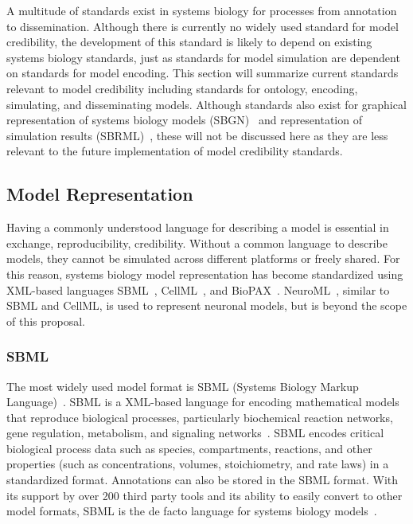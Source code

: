 \documentclass[12pt]{report}
\begin{document}
A multitude of standards exist in systems biology for processes from annotation to dissemination. Although there is currently no widely used standard for model credibility, the development of this standard is likely to depend on existing systems biology standards, just as standards for model simulation are dependent on standards for model encoding. This section will summarize current standards relevant to model credibility including standards for ontology, encoding, simulating, and disseminating models.  Although standards also exist for graphical representation of systems biology models (SBGN)~\cite{SBGN} and representation of simulation results (SBRML)~\cite{SBRML}, these will not be discussed here as they are less relevant to the future implementation of model credibility standards. 

\subsection{Model Representation}
Having a commonly understood language for describing a model is essential in exchange, reproducibility, credibility. Without a common language to describe models, they cannot be simulated across different platforms or freely shared. For this reason, systems biology model representation has become standardized using XML-based languages SBML~\cite{Klipp2007StandardsIC, machado_modeling_2011}, CellML~\cite{CellML}, and BioPAX~\cite{demir_biopax_2010}. NeuroML~\cite{Gleeson2010}, similar to SBML and CellML, is used to represent neuronal models, but is beyond the scope of this proposal.  

\subsubsection{SBML}

The most widely used model format is SBML (Systems Biology Markup Language)~\cite{SBML, Finney2003, Klipp2007StandardsIC, machado_modeling_2011}. SBML is a XML-based language for encoding mathematical models that reproduce biological processes, particularly biochemical reaction networks, gene regulation, metabolism, and signaling networks~\cite{SBML, Kohl2011}. SBML encodes critical biological process data such as species, compartments, reactions, and other properties (such as concentrations, volumes, stoichiometry, and rate laws) in a standardized format. Annotations can also be stored in the SBML format. With its support by over 200 third party tools and its ability to easily convert to other model formats, SBML is the de facto language for systems biology models~\cite{Kohl2011, machado_modeling_2011}.
\end{document}
